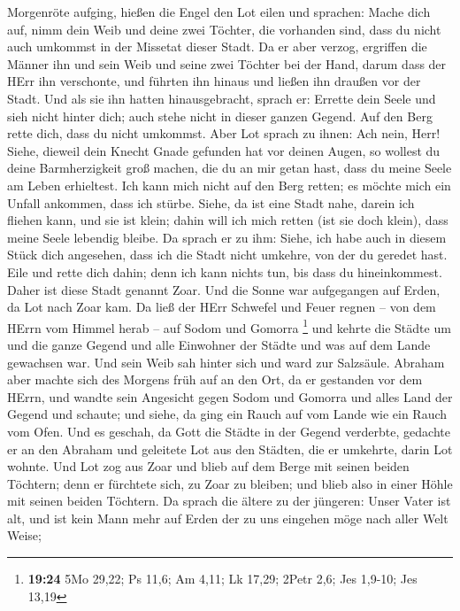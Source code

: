 Morgenröte aufging, hießen die Engel den Lot eilen und sprachen: Mache
dich auf, nimm dein Weib und deine zwei Töchter, die vorhanden sind,
dass du nicht auch umkommst in der Missetat dieser Stadt. 
Da er aber verzog, ergriffen die Männer ihn und sein Weib und seine zwei
Töchter bei der Hand, darum dass der HErr ihn verschonte, und führten
ihn hinaus und ließen ihn draußen vor der Stadt.  Und als
sie ihn hatten hinausgebracht, sprach er: Errette dein Seele und sieh
nicht hinter dich; auch stehe nicht in dieser ganzen Gegend. Auf den
Berg rette dich, dass du nicht umkommst.  Aber Lot sprach
zu ihnen: Ach nein, Herr!  Siehe, dieweil dein Knecht Gnade
gefunden hat vor deinen Augen, so wollest du deine Barmherzigkeit groß
machen, die du an mir getan hast, dass du meine Seele am Leben
erhieltest. Ich kann mich nicht auf den Berg retten; es möchte mich ein
Unfall ankommen, dass ich stürbe.  Siehe, da ist eine Stadt
nahe, darein ich fliehen kann, und sie ist klein; dahin will ich mich
retten (ist sie doch klein), dass meine Seele lebendig bleibe.
 Da sprach er zu ihm: Siehe, ich habe auch in diesem Stück
dich angesehen, dass ich die Stadt nicht umkehre, von der du geredet
hast.  Eile und rette dich dahin; denn ich kann nichts tun,
bis dass du hineinkommest. Daher ist diese Stadt genannt Zoar.
 Und die Sonne war aufgegangen auf Erden, da Lot nach Zoar
kam.  Da ließ der HErr Schwefel und Feuer regnen -- von dem
HErrn vom Himmel herab -- auf Sodom und Gomorra \footnote{\textbf{19:24}
  5Mo 29,22; Ps 11,6; Am 4,11; Lk 17,29; 2Petr 2,6; Jes 1,9-10; Jes
  13,19}  und kehrte die Städte um und die ganze Gegend und
alle Einwohner der Städte und was auf dem Lande gewachsen war.
 Und sein Weib sah hinter sich und ward zur Salzsäule.
 Abraham aber machte sich des Morgens früh auf an den Ort,
da er gestanden vor dem HErrn,  und wandte sein Angesicht
gegen Sodom und Gomorra und alles Land der Gegend und schaute; und
siehe, da ging ein Rauch auf vom Lande wie ein Rauch vom Ofen.
 Und es geschah, da Gott die Städte in der Gegend
verderbte, gedachte er an den Abraham und geleitete Lot aus den Städten,
die er umkehrte, darin Lot wohnte.  Und Lot zog aus Zoar
und blieb auf dem Berge mit seinen beiden Töchtern; denn er fürchtete
sich, zu Zoar zu bleiben; und blieb also in einer Höhle mit seinen
beiden Töchtern.  Da sprach die ältere zu der jüngeren:
Unser Vater ist alt, und ist kein Mann mehr auf Erden der zu uns
eingehen möge nach aller Welt Weise;


